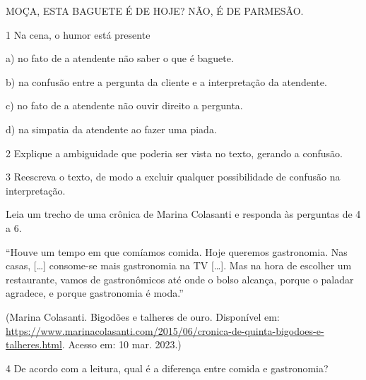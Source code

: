 MOÇA, ESTA BAGUETE É DE HOJE? NÃO, É DE PARMESÃO.

\num{1} Na cena, o humor está presente

a) no fato de a atendente não saber o que é baguete.

b) na confusão entre a pergunta da cliente e a interpretação da
atendente.

c) no fato de a atendente não ouvir direito a pergunta.

d) na simpatia da atendente ao fazer uma piada.


\num{2} Explique a ambiguidade que poderia ser vista no texto, gerando a
confusão.



\num{3} Reescreva o texto, de modo a excluir qualquer possibilidade de
confusão na interpretação.



Leia um trecho de uma crônica de Marina Colasanti e responda às
perguntas de 4 a 6.

``Houve um tempo em que comíamos comida. Hoje queremos gastronomia. Nas
casas, {[}\ldots{]} consome-se mais gastronomia na TV {[}\ldots{]}. Mas
na hora de escolher um restaurante, vamos de gastronômicos até onde o
bolso alcança, porque o paladar agradece, e porque gastronomia é moda.''

(Marina Colasanti. Bigodões e talheres de ouro. Disponível em:
\url{https://www.marinacolasanti.com/2015/06/cronica-de-quinta-bigodoes-e-talheres.html}.
Acesso em: 10 mar. 2023.)

\num{4} De acordo com a leitura, qual é a diferença entre comida e
gastronomia?

